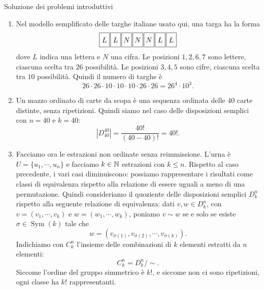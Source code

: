 \documentclass[a4paper]{article}
\begin{document}
\begin{snippetsolution}{Soluzione dei problemi introduttivi}
    \begin{enumerate}
        \item Nel modello semplificato delle targhe italiane usato qui, una targa ha la forma
            \[
                \begin{tikzpicture}[baseline=(current bounding box.center)]
                    \foreach \x/\lab in {0/L,1/L,2/N,3/N,4/N,5/L,6/L}{
                        \draw (\x*0.55,0) rectangle ++(0.5,0.7);
                        \node at (\x*0.55+0.25,0.35) {\(\lab\)};
                    }
                \end{tikzpicture}
            \]
            dove \(L\) indica una lettera e \(N\) una cifra.
            Le posizioni \(1,2,6,7\) sono lettere, ciascuna scelta tra \(26\) possibilità.
            Le posizioni \(3,4,5\) sono cifre, ciascuna scelta tra \(10\) possibilità.
            Quindi il numero di targhe è
            \[
                26\cdot 26\cdot 10\cdot 10\cdot 10\cdot 26\cdot 26
                =
                26^4\cdot 10^3.
            \]
        \item Un mazzo ordinato di carte da scopa è una sequenza ordinata delle \(40\) carte distinte, senza ripetizioni.
            Quindi siamo nel caso delle disposizioni semplici con \(n=40\) e \(k=40\):
            \[
                |D_{40}^{40}|
                =
                \frac{40!}{(40-40)!}
                =
                40!.
            \]
        \item Facciamo ora le estrazioni non ordinate senza reimmissione.
            L'urna è \(U=\{u_1,\cdots,u_n\}\) e facciamo \(k\in\mathbb{N}\) estrazioni con \(k\leq n\).
            Rispetto al caso precedente, i vari casi diminuiscono: possiamo rappresentare i risultati come classi di equivalenza rispetto alla relazione di essere uguali a meno di una permutazione.
            Quindi consideriamo il quoziente delle disposizioni semplici \(D_k^n\) rispetto alla seguente relazione di equivalenza: dati \(v,w\in D_k^n\), con \(v=(v_1,\cdots,v_k)\) e \(w=(w_1,\cdots,w_k)\), poniamo \(v\sim w\) se e solo se esiste \(\sigma\in\operatorname{Sym}(k)\) tale che
            \[
                w=(v_{\sigma(1)},v_{\sigma(2)},\cdots,v_{\sigma(k)}).
            \]
            Indichiamo con \(C_k^n\) l'insieme delle combinazioni di \(k\) elementi estratti da \(n\) elementi:
            \[
                C_k^n=D_k^n/{\sim}.
            \]
            Siccome l'ordine del gruppo simmetrico è \(k!\), e siccome non ci sono ripetizioni, ogni classe ha \(k!\) rappresentanti.

\end{enumerate}
\end{snippetsolution}
\end{document}
